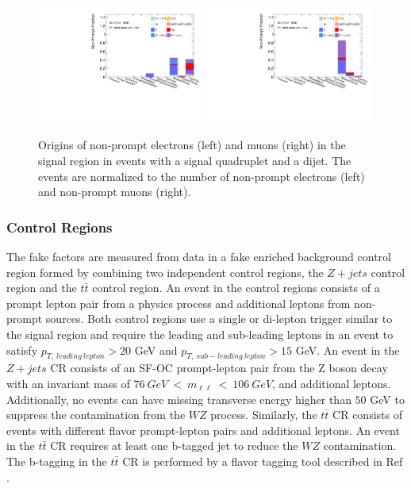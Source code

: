 \begin{figure}[htb]
    \centering
    \includegraphics[width = 0.49\textwidth]{figures/Analysis/Background/NonPromptElectronSRVBSComposition.pdf}
    \includegraphics[width = 0.49\textwidth]{figures/Analysis/Background/NonPromptMuonSRVBSComposition.pdf}
    \caption{ Origins of non-prompt electrons (left) and muons (right) in the signal region in events with a signal quadruplet and a dijet. The events are normalized to the number of non-prompt electrons (left) and non-prompt muons (right). \label{fig:NonPromptLepSRDijet}}
\end{figure}

\subsubsection{Control Regions}
\label{subsubsec:CR}
The fake factors are measured from data in a fake enriched background control region formed by combining two independent control regions, the $Z+jets$ control region and the $t\bar{t}$ control region. An event in the control regions consists of a prompt lepton pair from a physics process and additional leptons from non-prompt sources. Both control regions use a single or di-lepton trigger similar to the signal region and require the leading and sub-leading leptons in an event to satisfy $p_{T,~leading~lepton} > 20$ GeV and $p_{T,~sub-leading~lepton} > 15$ GeV. An event in the $Z+jets$ CR consists of an SF-OC prompt-lepton pair from the Z boson decay with an invariant mass of $ 76~GeV~<~m_{\ell \ell}~<~106~GeV$, and additional leptons. Additionally, no events can have missing transverse energy higher than $50$ GeV to suppress the contamination from the $WZ$ process. Similarly, the $t\bar{t}$ CR consists of events with different flavor prompt-lepton pairs and additional leptons. An event in the $t\bar{t}$ CR requires at least one b-tagged jet to reduce the $WZ$ contamination. The b-tagging in the $t\bar{t}$ CR is performed by a flavor tagging tool described in Ref \cite{btagATLAS}.

